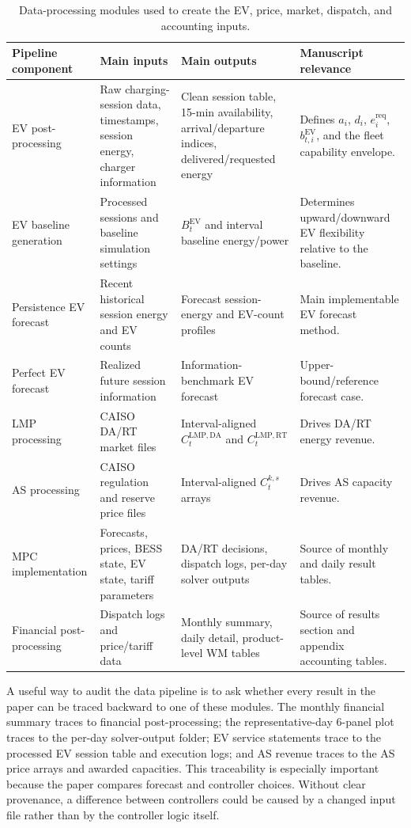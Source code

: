 \documentclass[final,5p,times]{elsarticle}
\newcommand{\EV}{\mathrm{EV}}
\newcommand{\DA}{\mathrm{DA}}
\newcommand{\RT}{\mathrm{RT}}
\newcommand{\req}{\mathrm{req}}
\begin{document}
\begin{table}[!t]
\centering
\caption{Data-processing modules used to create the EV, price, market, dispatch, and accounting inputs.}
\label{tab:data_pipeline}
\scriptsize
\begin{tabularx}{\textwidth}{@{}p{}p{}p{}X@{}}
\toprule
Pipeline component & Main inputs & Main outputs & Manuscript relevance \\
\midrule
EV post-processing & Raw charging-session data, timestamps, session energy, charger information & Clean session table, 15-min availability, arrival/departure indices, delivered/requested energy & Defines $a_i$, $d_i$, $e_i^{\req}$, $b_{t,i}^{\EV}$, and the fleet capability envelope.\\
EV baseline generation & Processed sessions and baseline simulation settings & $B_t^{\EV}$ and interval baseline energy/power & Determines upward/downward EV flexibility relative to the baseline.\\
Persistence EV forecast & Recent historical session energy and EV counts & Forecast session-energy and EV-count profiles & Main implementable EV forecast method.\\
Perfect EV forecast & Realized future session information & Information-benchmark EV forecast & Upper-bound/reference forecast case.\\
LMP processing & CAISO DA/RT market files & Interval-aligned $C_t^{\mathrm{LMP},\DA}$ and $C_t^{\mathrm{LMP},\RT}$ & Drives DA/RT energy revenue.\\
AS processing & CAISO regulation and reserve price files & Interval-aligned $C_t^{k,s}$ arrays & Drives AS capacity revenue.\\
MPC implementation & Forecasts, prices, BESS state, EV state, tariff parameters & DA/RT decisions, dispatch logs, per-day solver outputs & Source of monthly and daily result tables.\\
Financial post-processing & Dispatch logs and price/tariff data & Monthly summary, daily detail, product-level WM tables & Source of results section and appendix accounting tables.\\
\bottomrule
\end{tabularx}
\end{table}

A useful way to audit the data pipeline is to ask whether every result in the paper can be traced backward to one of these modules. The monthly financial summary traces to financial post-processing; the representative-day 6-panel plot traces to the per-day solver-output folder; EV service statements trace to the processed EV session table and execution logs; and AS revenue traces to the AS price arrays and awarded capacities. This traceability is especially important because the paper compares forecast and controller choices. Without clear provenance, a difference between controllers could be caused by a changed input file rather than by the controller logic itself.
\end{document}
